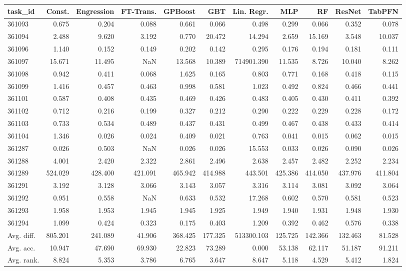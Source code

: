 \begin{tabular}{lrrrrrrrrrr}
\toprule
task\_id & Const. & Engression & FT-Trans. & GPBoost & GBT & Lin. Regr. & MLP & RF & ResNet & TabPFN \\
\midrule
361093 & 0.675 & 0.204 & 0.088 & 0.661 & 0.066 & 0.498 & 0.299 & 0.066 & 0.352 & 0.078 \\
361094 & 2.488 & 9.620 & 3.192 & 0.770 & 20.472 & 14.294 & 2.659 & 15.169 & 3.548 & 10.037 \\
361096 & 1.140 & 0.152 & 0.149 & 0.202 & 0.142 & 0.295 & 0.176 & 0.194 & 0.181 & 0.111 \\
361097 & 15.671 & 11.495 & NaN & 13.568 & 10.389 & 714901.390 & 11.535 & 8.726 & 10.040 & 8.262 \\
361098 & 0.942 & 0.411 & 0.068 & 1.625 & 0.165 & 0.803 & 0.771 & 0.168 & 0.418 & 0.115 \\
361099 & 1.416 & 0.457 & 0.463 & 0.998 & 0.581 & 1.023 & 0.492 & 0.824 & 0.466 & 0.441 \\
361101 & 0.587 & 0.408 & 0.435 & 0.469 & 0.426 & 0.483 & 0.405 & 0.430 & 0.411 & 0.392 \\
361102 & 0.712 & 0.216 & 0.199 & 0.327 & 0.212 & 0.290 & 0.222 & 0.229 & 0.228 & 0.172 \\
361103 & 0.733 & 0.534 & 0.489 & 0.437 & 0.431 & 0.499 & 0.467 & 0.438 & 0.433 & 0.414 \\
361104 & 1.346 & 0.026 & 0.024 & 0.409 & 0.021 & 0.763 & 0.041 & 0.015 & 0.062 & 0.015 \\
361287 & 0.026 & 0.503 & NaN & 0.026 & 0.026 & 15.553 & 0.033 & 0.026 & 0.090 & 0.026 \\
361288 & 4.001 & 2.420 & 2.322 & 2.861 & 2.496 & 2.638 & 2.457 & 2.482 & 2.252 & 2.234 \\
361289 & 524.029 & 428.400 & 421.091 & 465.942 & 414.988 & 443.501 & 425.386 & 414.050 & 437.976 & 411.804 \\
361291 & 3.192 & 3.128 & 3.066 & 3.143 & 3.057 & 3.316 & 3.114 & 3.081 & 3.092 & 3.064 \\
361292 & 0.951 & 0.558 & NaN & 0.633 & 0.532 & 17.268 & 0.602 & 0.570 & 0.581 & 0.523 \\
361293 & 1.958 & 1.953 & 1.945 & 1.945 & 1.925 & 1.949 & 1.940 & 1.931 & 1.948 & 1.930 \\
361294 & 1.099 & 0.424 & 0.323 & 0.175 & 0.403 & 1.209 & 0.392 & 0.462 & 0.576 & 0.338 \\
Avg. diff. & 805.201 & 241.089 & 41.906 & 368.425 & 177.325 & 513300.103 & 125.725 & 142.366 & 132.463 & 81.528 \\
Avg. acc. & 10.947 & 47.690 & 69.930 & 22.823 & 73.289 & 0.000 & 53.138 & 62.117 & 51.187 & 91.211 \\
Avg. rank. & 8.824 & 5.353 & 3.786 & 6.765 & 3.647 & 8.647 & 5.118 & 4.529 & 5.412 & 1.824 \\
\bottomrule
\end{tabular}

